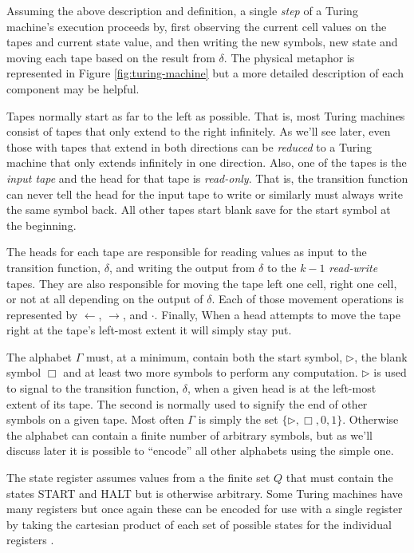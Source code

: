 \documentclass[usletter]{article}
\begin{document}
Assuming the above description and definition, a single \textit{step} of a Turing machine's execution proceeds by, first observing the current cell values on the tapes and current state value, and then writing the new symbols, new state and moving each tape based on the result from $\delta$. The physical metaphor is represented in Figure \ref{fig:turing-machine} but a more detailed description of each component may be helpful.

Tapes normally start as far to the left as possible. That is, most Turing machines consist of tapes that only extend to the right infinitely. As we'll see later, even those with tapes that extend in both directions can be \textit{reduced} to a Turing machine that only extends infinitely in one direction. Also, one of the tapes is the \textit{input tape} and the head for that tape is \textit{read-only}. That is, the transition function can never tell the head for the input tape to write or similarly must always write the same symbol back. All other tapes start blank save for the start symbol at the beginning.

The heads for each tape are responsible for reading values as input to the transition function, $\delta$, and writing the output from $\delta$ to the $k-1$ \textit{read-write} tapes. They are also responsible for moving the tape left one cell, right one cell, or not at all depending on the output of $\delta$. Each of those movement operations is represented by $\leftarrow$, $\rightarrow$, and $\cdot$. Finally, When a head attempts to move the tape right at the tape's left-most extent it will simply stay put.

The alphabet $\Gamma$ must, at a minimum, contain both the start symbol, $\rhd$, the blank symbol $\Box$ and at least two more symbols to perform any computation. $\rhd$ is used to signal to the transition function, $\delta$, when a given head is at the left-most extent of its tape. The second is normally used to signify the end of other symbols on a given tape. Most often $\Gamma$ is simply the set $\{\rhd, \Box, 0, 1\}$. Otherwise the alphabet can contain a finite number of arbitrary symbols, but as we'll discuss later it is possible to ``encode'' all other alphabets using the simple one.

The state register assumes values from a the finite set $Q$ that must contain the states \textsf{START} and \textsf{HALT} but is otherwise arbitrary. Some Turing machines have many registers but once again these can be encoded for use with a single register by taking the cartesian product of each set of possible states for the individual registers \cite{textbook}.
\end{document}
